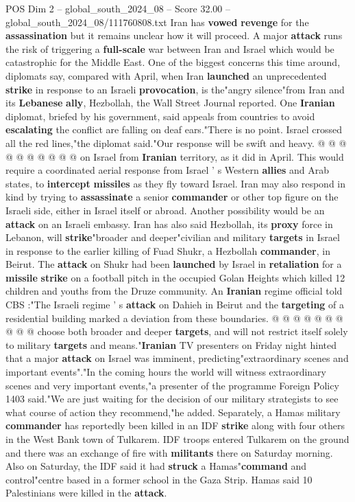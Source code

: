 \begin{textsample}{POS Dim 2 – global\_south\_2024\_08 – Score 32.00 – global\_south\_2024\_08/111760808.txt}
Iran has \textbf{vowed} \textbf{revenge} for the \textbf{assassination} but it remains unclear how it will proceed.
A major \textbf{attack} runs the risk of triggering a \textbf{full-scale} war between Iran and Israel which would be catastrophic for the Middle East.
One of the biggest concerns this time around, diplomats say, compared with April, when Iran \textbf{launched} an unprecedented \textbf{strike} in response to an Israeli \textbf{provocation}, is the"angry silence"from Iran and its \textbf{Lebanese} \textbf{ally}, Hezbollah, the Wall Street Journal reported.
One \textbf{Iranian} diplomat, briefed by his government, said appeals from countries to avoid \textbf{escalating} the conflict are falling on deaf ears."There is no point.
Israel crossed all the red lines,"the diplomat said."Our response will be swift and heavy. @ @ @ @ @ @ @ @ @ @ on Israel from \textbf{Iranian} territory, as it did in April.
This would require a coordinated aerial response from Israel ' s Western \textbf{allies} and Arab states, to \textbf{intercept} \textbf{missiles} as they fly toward Israel.
Iran may also respond in kind by trying to \textbf{assassinate} a senior \textbf{commander} or other top figure on the Israeli side, either in Israel itself or abroad.
Another possibility would be an \textbf{attack} on an Israeli embassy.
Iran has also said Hezbollah, its \textbf{proxy} force in Lebanon, will \textbf{strike}"broader and deeper"civilian and military \textbf{targets} in Israel in response to the earlier killing of Fuad Shukr, a Hezbollah \textbf{commander}, in Beirut.
The \textbf{attack} on Shukr had been \textbf{launched} by Israel in \textbf{retaliation} for a \textbf{missile} \textbf{strike} on a football pitch in the occupied Golan Heights which killed 12 children and youths from the Druze community.
An \textbf{Iranian} regime official told CBS :"The Israeli regime ' s \textbf{attack} on Dahieh in Beirut and the \textbf{targeting} of a residential building marked a deviation from these boundaries. @ @ @ @ @ @ @ @ @ @ choose both broader and deeper \textbf{targets}, and will not restrict itself solely to military \textbf{targets} and means."\textbf{Iranian} TV presenters on Friday night hinted that a major \textbf{attack} on Israel was imminent, predicting"extraordinary scenes and important events"."In the coming hours the world will witness extraordinary scenes and very important events,"a presenter of the programme Foreign Policy 1403 said."We are just waiting for the decision of our military strategists to see what course of action they recommend,"he added.
Separately, a Hamas military \textbf{commander} has reportedly been killed in an IDF \textbf{strike} along with four others in the West Bank town of Tulkarem.
IDF troops entered Tulkarem on the ground and there was an exchange of fire with \textbf{militants} there on Saturday morning.
Also on Saturday, the IDF said it had \textbf{struck} a Hamas"\textbf{command} and control"centre based in a former school in the Gaza Strip.
Hamas said 10 Palestinians were killed in the \textbf{attack}.


\end{textsample}
